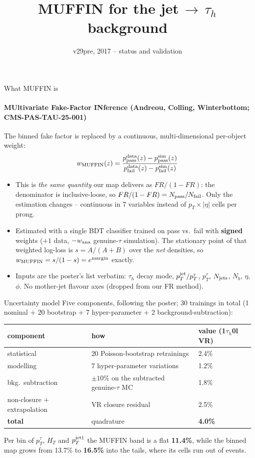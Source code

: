 \documentclass[aspectratio=169,10pt]{beamer}
\title{MUFFIN for the jet$\,\to\,\tau_h$ background}
\subtitle{v29pre, 2017 -- status and validation}
\date{}
\begin{document}
\begin{frame}
  \titlepage
\end{frame}

\begin{frame}{What MUFFIN is}
  \framesubtitle{MUltivariate Fake-Factor INference (Andreou, Colling, Winterbottom; CMS-PAS-TAU-25-001)}
  \small
  The binned fake factor is replaced by a continuous, multi-dimensional
  per-object weight:
  \[
    w_{\rm MUFFIN}(z)=\frac{p^{\rm data}_{\rm pass}(z)-p^{\rm sim}_{\rm pass}(z)}
                           {p^{\rm data}_{\rm fail}(z)-p^{\rm sim}_{\rm fail}(z)}
  \]
  \begin{itemize}
    \item This is \emph{the same quantity} our map delivers as $FR/(1-FR)$: the
      denominator is inclusive-loose, so $FR/(1-FR)=N_{\rm pass}/N_{\rm fail}$.
      Only the estimation changes -- continuous in 7 variables instead of
      $p_T\times|\eta|$ cells per prong.
    \item Estimated with a single BDT classifier trained on pass vs.\ fail with
      \textbf{signed} weights ($+1$ data, $-w_{\rm ana}$ genuine-$\tau$ simulation).
      The stationary point of that weighted log-loss is $s=A/(A{+}B)$ over the
      \emph{net} densities, so $w_{\rm MUFFIN}=s/(1-s)=e^{\rm margin}$ exactly.
    \item Inputs are the poster's list verbatim: $\tau_h$ decay mode,
      $p_T^{\rm jet}/p_T^{\tau}$, $p_T^{\tau}$, $N_{\rm jets}$, $N_{b}$,
      $\eta$, $\phi$. No mother-jet flavour axes (dropped from our FR method).
  \end{itemize}
\end{frame}

\begin{frame}{Uncertainty model}
  \small
  Five components, following the poster; 30 trainings in total
  (1 nominal $+$ 20 bootstrap $+$ 7 hyper-parameter $+$ 2 background-subtraction):
  \vspace{0.3em}
  \begin{center}
  \begin{tabular}{lll}
    \toprule
    component & how & value (1$\tau_h$0l VR) \\
    \midrule
    statistical & 20 Poisson-bootstrap retrainings & 2.4\% \\
    modelling   & 7 hyper-parameter variations & 1.2\% \\
    bkg.\ subtraction & $\pm10\%$ on the subtracted genuine-$\tau$ MC & 1.8\% \\
    non-closure $+$ extrapolation & VR closure residual & 2.5\% \\
    \midrule
    \textbf{total} & quadrature & \textbf{4.0\%} \\
    \bottomrule
  \end{tabular}
  \end{center}
  \vspace{0.4em}
  Per bin of $p_T^{\tau}$, $H_T$ and $p_T^{\rm jet 1}$ the MUFFIN band is a flat
  \textbf{11.4\%}, while the binned map grows from 13.7\% to \textbf{16.5\%}
  into the tails, where its cells run out of events.
\end{frame}
\end{document}
